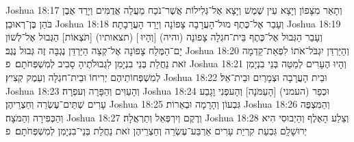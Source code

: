 Joshua 18:17	וְתָאַר מִצָּפוֹן וְיָצָא עֵין שֶׁמֶשׁ וְיָצָא אֶל־גְּלִילוֹת אֲשֶׁר־נֹכַח מַעֲלֵה אֲדֻמִּים וְיָרַד אֶבֶן בֹּהַן בֶּן־רְאוּבֵן׃
Joshua 18:18	וְעָבַר אֶל־כֶּתֶף מוּל־הָעֲרָבָה צָפוֹנָה וְיָרַד הָעֲרָבָתָה׃
Joshua 18:19	וְעָבַר הַגְּבוּל אֶל־כֶּתֶף בֵּית־חגְלָה צָפוֹנָה (והיה) [וְהָיוּ ] (תצאותיו) [תֹּצְאוֹת] הַגְּבוּל אֶל־לְשׁוֹן יָם־הַמֶּלַח צָפוֹנָה אֶל־קְצֵה הַיַּרְדֵּן נֶגְבָּה זֶה גְּבוּל נֶגֶב׃
Joshua 18:20	וְהַיַּרְדֵּן יִגְבֹּל־אֹתוֹ לִפְאַת־קֵדְמָה זֹאת נַחֲלַת בְּנֵי בִנְיָמִן לִגְבוּלֹתֶיהָ סָבִיב לְמִשְׁפְּחֹתָם׃ {פ}
Joshua 18:21	וְהָיוּ הֶעָרִים לְמַטֵּה בְּנֵי בִנְיָמִן לְמִשְׁפְּחוֹתֵיהֶם יְרִיחוֹ וּבֵית־חגְלָה וְעֵמֶק קְצִיץ׃
Joshua 18:22	וּבֵית הָעֲרָבָה וּצְמָרַיִם וּבֵית־אֵל׃
Joshua 18:23	וְהָעַוִּים וְהַפָּרָה וְעפְרָה׃
Joshua 18:24	וּכְפַר (העמני) [הָעַמֹּנָה] וְהָעפְנִי וָגָבַע עָרִים שְׁתֵּים־עֶשְׂרֵה וְחַצְרֵיהֶן׃
Joshua 18:25	גִּבְעוֹן וְהָרָמָה וּבְאֵרוֹת׃
Joshua 18:26	וְהַמִּצְפֶּה וְהַכְּפִירָה וְהַמֹּצָה׃
Joshua 18:27	וְרֶקֶם וְיִרְפְּאֵל וְתַרְאֲלָה׃
Joshua 18:28	וְצֵלַע הָאֶלֶף וְהַיְבוּסִי הִיא יְרוּשָׁלַ͏ִם גִּבְעַת קִרְיַת עָרִים אַרְבַּע־עֶשְׂרֵה וְחַצְרֵיהֶן זֹאת נַחֲלַת בְּנֵי־בִנְיָמִן לְמִשְׁפְּחֹתָם׃ {פ}
